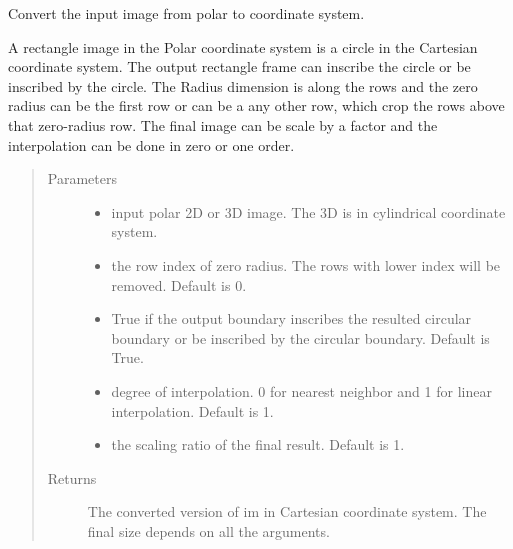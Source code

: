 \documentclass[letterpaper,10pt,english]{sphinxmanual}
\begin{document}
\begin{fulllineitems}
\label{\detokenize{index:util.polar2cartesian.polar2cartesian}}
Convert the input image from polar to  coordinate system.

A rectangle image in the Polar coordinate system is a circle in the Cartesian coordinate system.  The output
rectangle frame can inscribe the circle or be inscribed by the circle.  The Radius dimension is along the rows and
the zero radius can be the first row or can be a any other row, which crop the rows above that zero-radius row.
The final image can be scale by a factor and the interpolation can be done in zero or one order.
\begin{quote}\begin{description}
\item[{Parameters}] \leavevmode\begin{itemize}
\item {} 
 \textendash{} input polar 2D or 3D image. The 3D is in cylindrical coordinate system.

\item {} 
 \textendash{} the row index of zero radius. The rows with lower index will be removed.  Default is 0.

\item {} 
 \textendash{} True if the output boundary inscribes the resulted circular boundary or be inscribed by the circular
boundary.  Default is True.

\item {} 
 \textendash{} degree of interpolation.  0 for nearest neighbor and 1 for linear interpolation.  Default is 1.

\item {} 
 \textendash{} the scaling ratio of the final result.  Default is 1.

\end{itemize}

\item[{Returns}] \leavevmode
The converted version of im in Cartesian coordinate system.  The final size depends on all the arguments.

\end{description}\end{quote}

\end{fulllineitems}
\end{document}
